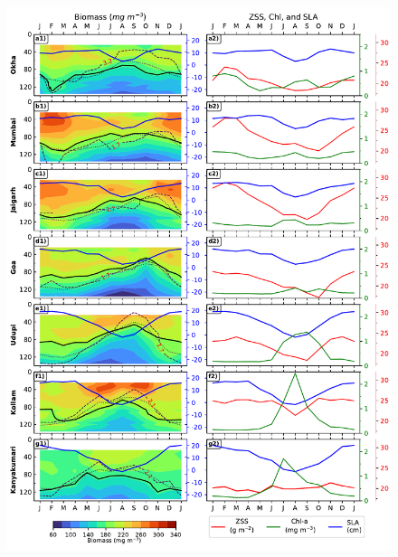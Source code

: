 \documentclass[authoryear,review,11pt]{elsarticle}
\providecommand{\DIFaddbeginFL}{} %
\providecommand{\DIFaddendFL}{} %
\providecommand{\DIFdelbeginFL}{} %
\providecommand{\DIFdelendFL}{} %
\begin{document}
\begin{figure}[htbp]
	\centering
	\DIFdelbeginFL %
\DIFdelendFL \DIFaddbeginFL \includegraphics[width=\textwidth]{./fig_05_biomass_ss_chl_climatology.pdf} 
	\DIFaddendFL \captionsetup{justification=justified,font=footnotesize,skip=0.05\baselineskip,width=\textwidth}

\end{figure}
\end{document}
